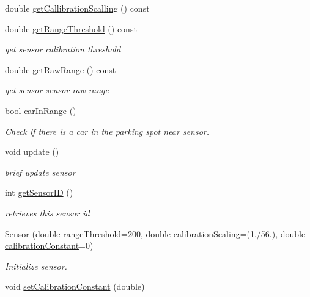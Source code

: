 \begin{DoxyCompactItemize}
double \mbox{\hyperlink{class_sensor_aa3ed2c53fe69cdf256574edc0ccacdcf}{get\+Callibration\+Scalling}} () const
\item 
double \mbox{\hyperlink{class_sensor_a5c0b861048790221428d0af95c8bdfe4}{get\+Range\+Threshold}} () const
\begin{DoxyCompactList}\small\item\em get sensor calibration threshold \end{DoxyCompactList}\item 
double \mbox{\hyperlink{class_sensor_a6df3b3905c4a873edb3e820339d75001}{get\+Raw\+Range}} () const
\begin{DoxyCompactList}\small\item\em get sensor sensor raw range \end{DoxyCompactList}\item 
bool \mbox{\hyperlink{class_sensor_ad8fa0c6ed89be5d735ab9a876fc71932}{car\+In\+Range}} ()
\begin{DoxyCompactList}\small\item\em Check if there is a car in the parking spot near sensor. \end{DoxyCompactList}\item 
void \mbox{\hyperlink{class_sensor_a542a721041768395de2c6e9012622113}{update}} ()
\begin{DoxyCompactList}\small\item\em brief update sensor \end{DoxyCompactList}\item 
int \mbox{\hyperlink{class_sensor_ab173b3d269feeea488a823025d3f32a7}{get\+Sensor\+ID}} ()
\begin{DoxyCompactList}\small\item\em retrieves this sensor id \end{DoxyCompactList}\item 
\mbox{\hyperlink{class_sensor_afeebb42b714028d41e68f8149c98d19b}{Sensor}} (double \mbox{\hyperlink{class_sensor_a3ef8fe9d533d6b9ca9cfbaba5bc072c4}{range\+Threshold}}=200, double \mbox{\hyperlink{class_sensor_a36d68507776088618b17ed25ac8d018c}{calibration\+Scaling}}=(1./56.), double \mbox{\hyperlink{class_sensor_a370acf36d39381aa3052c84e2d9f8443}{calibration\+Constant}}=0)
\begin{DoxyCompactList}\small\item\em Initialize sensor. \end{DoxyCompactList}\item 
void \mbox{\hyperlink{class_sensor_ad4ef1c3ac7c3ed7427d4337ab3762228}{set\+Calibration\+Constant}} (double)

\end{DoxyCompactItemize}
